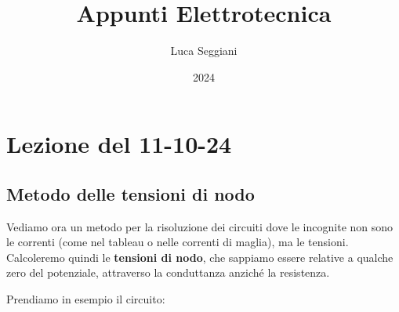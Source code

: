 \documentclass[a4paper,11pt]{article}
\title{Appunti Elettrotecnica}
\author{Luca Seggiani}
\date{2024}
\begin{document}
\section{Lezione del 11-10-24}

\thispagestyle{empty}
\pagestyle{fancy}

\subsection{Metodo delle tensioni di nodo}
Vediamo ora un metodo per la risoluzione dei circuiti dove le incognite non sono le correnti (come nel tableau o nelle correnti di maglia), ma le tensioni.
Calcoleremo quindi le \textbf{tensioni di nodo}, che sappiamo essere relative a qualche zero del potenziale, attraverso la conduttanza anziché la resistenza.

Prendiamo in esempio il circuito:
\end{document}
